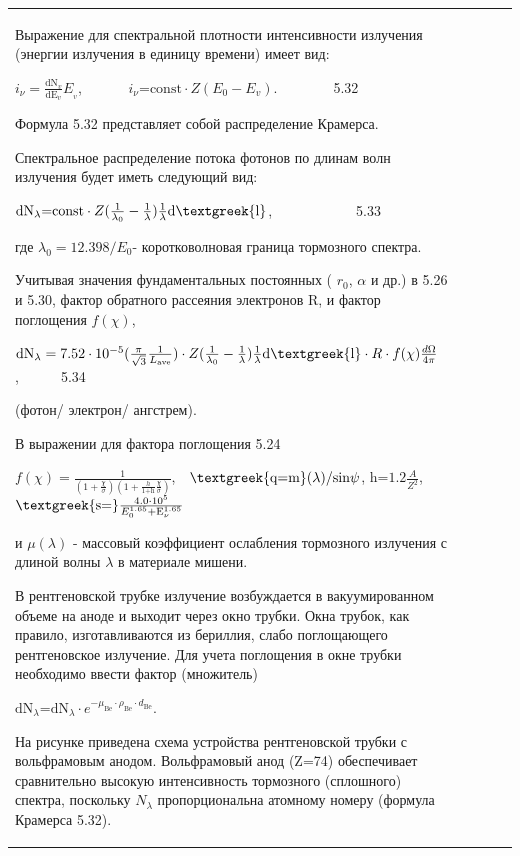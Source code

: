 \documentclass[a4paper,14pt, openany, twoside, draft]{extbook} %
\begin{document}
\begin{flushleft}
\begin{supertabular}{|m{1.7279999cm}|m{1.522cm}|m{1.522cm}|m{1.522cm}|m{1.744cm}|}
Выражение для спектральной плотности интенсивности излучения (энергии излучения в единицу времени) имеет вид:

 $i_{\nu }=\frac{{\text{dN}}_v}{{\text{dE}}_v}E_{_v}$, \ \ \ \ \ \  $i_{\nu }{\text{=const}}\cdot Z(E_0-E_v)$.\ \ \ \ \ \ \ \ 5.32

Формула 5.32 представляет собой распределение Крамерса.

Спектральное распределение потока фотонов по длинам волн излучения будет иметь следующий вид:

 ${\text{dN}}_{\lambda }{\text{=const}}\cdot Z(\frac 1{\lambda _0}-\frac 1{\lambda })\frac 1{\lambda }{\text{d\textgreek{l}}}$,\ \ \ \ \ \ \ \ \ \ \ \ 5.33

где  $\lambda _0=12.398/E_0${}- коротковолновая граница тормозного спектра.

Учитывая значения фундаментальных постоянных ( $r_0$, ${\alpha}$ и др.) в 5.26 и 5.30, фактор обратного рассеяния электронов R, и фактор поглощения $f(\chi )$,

 ${\text{dN}}_{\lambda }=7.52\cdot 10^{-5}(\frac{\pi }{\sqrt 3}\frac 1{L_{{\text{ave}}}})\cdot Z(\frac 1{\lambda _0}-\frac 1{\lambda })\frac 1{\lambda }{\text{d\textgreek{l}}}\cdot R\cdot f(\chi )\frac{d\Omega }{4\pi }$,\ \ \ \ \ \ 5.34

(фотон/ электрон/ ангстрем).

В выражении для фактора поглощения 5.24

 $f(\chi )=\frac 1{\left(1+\frac{\chi }{\sigma }\right)\left(1+\frac h{1{\text{+h}}}\frac{\chi }{\sigma }\right)}$,\ \  ${\text{\textgreek{q=m}}}(\lambda )\text{/sin}\psi $,   ${\text{h=}}1.2\frac A{Z^2}$,   ${\text{\textgreek{s=}}}\frac{4.0\cdot 10^5}{E_0^{1.65}{\text{+E}}_{\nu }^{1.65}}$

и  $\mu (\lambda )$ - массовый коэффициент ослабления тормозного излучения с длиной волны  $\lambda $ в материале мишени.

В рентгеновской трубке излучение возбуждается в вакуумированном объеме на аноде и выходит через окно трубки. Окна трубок, как правило, изготавливаются из бериллия, слабо поглощающего рентгеновское излучение. Для учета поглощения в окне трубки необходимо ввести фактор (множитель)

 ${\text{dN}}_{\lambda }{\text{=dN}}_{\lambda }\cdot e^{-\mu _{{\text{Be}}}\cdot \rho _{{\text{Be}}}\cdot d_{{\text{Be}}}}$.\ \

На рисунке приведена схема устройства рентгеновской трубки с вольфрамовым анодом. Вольфрамовый анод (Z=74) обеспечивает сравнительно высокую интенсивность тормозного (сплошного) спектра, поскольку  $N_{\lambda }$ пропорциональна атомному номеру (формула Крамерса 5.32).


\end{supertabular}
\end{flushleft}
\end{document}
